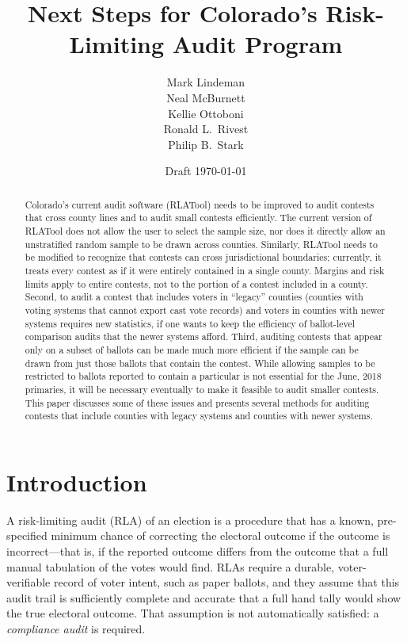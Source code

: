 \documentclass[12pt]{article}
\title{Next Steps for Colorado's Risk-Limiting Audit Program}
\author{
   Mark Lindeman\\
   Neal McBurnett\\
   Kellie Ottoboni\\
   Ronald L.~Rivest\\
   Philip B.~Stark
}
\date{Draft \today}
\begin{document}
\maketitle


\begin{abstract}
Colorado's current audit software (RLATool) needs to be improved to audit 
contests that cross county lines and to audit small contests efficiently.
The current version of RLATool does not allow the user to select the sample size, nor does
it directly allow an unstratified random sample to be drawn across counties.
Similarly, RLATool needs to be modified to recognize that contests can cross jurisdictional
boundaries; currently, it treats every contest as if it were entirely
contained in a single county.
Margins and risk limits apply to entire contests, not to the portion of a contest
included in a county.
Second, to audit a contest that includes voters in ``legacy'' counties 
(counties with voting systems that cannot export cast vote records) 
and voters in counties with newer systems requires new statistics, if one wants to
keep the efficiency of ballot-level comparison audits that the newer systems
afford.
Third, auditing contests that appear only on a subset of ballots can
be made much more efficient if the sample can be drawn from just those ballots
that contain the contest.
While allowing samples to be restricted to ballots reported to contain a particular
is not essential for the June, 2018 primaries, it will be necessary
eventually to make it feasible to audit smaller contests.
This paper discusses some of these issues and presents several
methods for auditing contests that include counties with
legacy systems and counties with newer systems.  
\end{abstract}

\section{Introduction}
A risk-limiting audit (RLA) of an election is a procedure that
has a known, pre-specified minimum chance of correcting the electoral outcome if the outcome
is incorrect---that is, if the reported outcome differs from the outcome that a full manual
tabulation of the votes would find. 
RLAs require a durable, voter-verifiable record of voter intent, such as paper ballots,
and they assume that this audit trail is sufficiently complete and accurate that a full hand
tally would show the true electoral outcome.
That assumption is not automatically satisfied: a \emph{compliance audit}
\citep{starkWagner12} 
is required.
\end{document}
